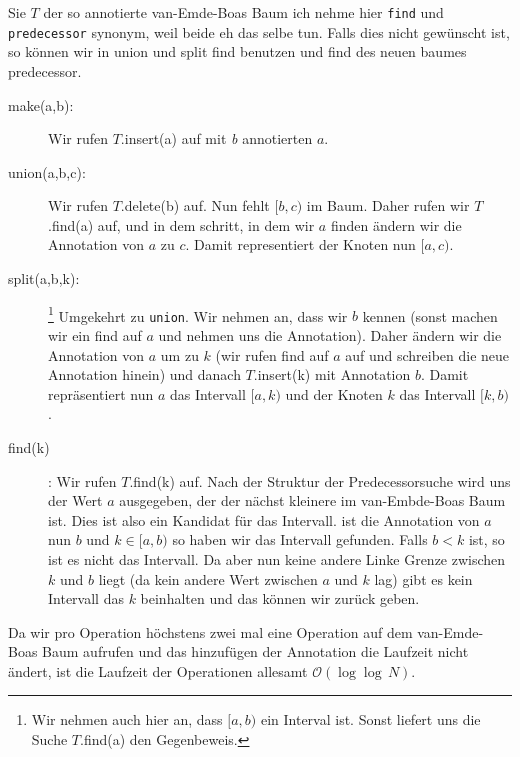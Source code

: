 \documentclass[11pt,a4paper,ngerman]{article}
\begin{document}
Sie $T$ der so annotierte van-Emde-Boas Baum ich nehme hier \lstinline|find| und \lstinline|predecessor| synonym, weil beide eh das selbe tun. Falls
dies nicht gewünscht ist, so können wir in union und split find benutzen und find des neuen baumes predecessor.

\begin{description}
	\item[make(a,b):]  Wir rufen $T$.insert(a) auf mit \emph{b} annotierten $a$.
	\item[union(a,b,c):] Wir rufen $T$.delete(b) auf. Nun fehlt $[b,c)$ im Baum. Daher rufen wir $T$.find(a) auf, und
		in dem schritt, in dem wir $a$ finden ändern wir die Annotation von $a$ zu $c$. Damit representiert der Knoten nun $[a,c)$.
	\item[split(a,b,k):]\footnote{Wir nehmen auch hier an, dass $[a,b)$ ein Interval ist. Sonst liefert uns die Suche $T$.find(a) den Gegenbeweis.}
		 Umgekehrt zu \lstinline|union|. Wir nehmen an, dass wir $b$ kennen (sonst machen wir ein find auf $a$ und nehmen
		uns die Annotation). Daher ändern wir die Annotation von $a$ um zu $k$ (wir rufen find auf $a$ auf und schreiben die neue Annotation 	
		hinein) und danach $T$.insert(k) mit Annotation $b$. Damit repräsentiert nun $a$ das Intervall $[a,k)$ und der Knoten $k$ das Intervall
		$[k,b)$. 
	\item[find(k)] : Wir rufen $T$.find(k) auf. Nach der Struktur der Predecessorsuche wird uns der Wert $a$ ausgegeben, der der nächst kleinere
		im van-Embde-Boas Baum ist. Dies ist also ein Kandidat für das Intervall. ist die Annotation von $a$ nun $b$ und $k \in [a,b)$ so
		haben wir das Intervall gefunden. Falls $b < k$ ist, so ist es nicht das Intervall. Da aber nun keine andere Linke Grenze zwischen $k$ und 		
		$b$ liegt (da kein andere Wert zwischen $a$ und $k$ lag) gibt es kein Intervall das $k$ beinhalten und das können wir zurück geben.
\end{description}

Da wir pro Operation höchstens zwei mal eine Operation auf dem van-Emde-Boas Baum aufrufen und das hinzufügen der Annotation die Laufzeit nicht ändert, ist die Laufzeit der Operationen allesamt $\mathcal{O}(\log \log \, N)$.

\label{LastPage}
\end{document}
